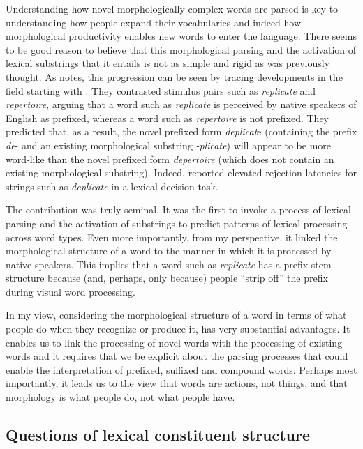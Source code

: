 \documentclass[output=paper]{langsci/langscibook}
\begin{document}
Understanding how novel morphologically complex words are parsed is key to understanding how people expand their vocabularies and indeed how morphological productivity enables new words to enter the language.  There seems to be good reason to believe that this morphological parsing and the activation of lexical substrings that it entails is not as simple and rigid as was previously thought.  As \citet{Libben2015} notes, this progression can be seen by tracing developments in the field starting with \citet{TaftForster1975}. They contrasted stimulus pairs such as \textit{replicate} and \textit{repertoire}, arguing that a word such as \textit{replicate} is perceived by native speakers of English as prefixed, whereas a word such as \textit{repertoire} is not prefixed. They predicted that, as a result, the novel prefixed form \textit{deplicat}e (containing the prefix \textit{de}{}- and an existing morphological substring \textit{-plicate}) will appear to be more word-like than the novel prefixed form \textit{depertoire} (which does not contain an existing morphological substring). Indeed, \citet{TaftForster1975} reported elevated rejection latencies for strings such as \textit{deplicate} in a lexical decision task.

The \citet{TaftForster1975} contribution was truly seminal. It was the first to invoke a process of lexical parsing and the activation of substrings to predict patterns of lexical processing across word types.  Even more importantly, from my perspective, it linked the morphological structure of a word to the manner in which it is processed by native speakers. This implies that a word such as \textit{replicate} has a prefix-stem structure because (and, perhaps, only because) people ``strip off'' the prefix during visual word processing.  

In my view, considering the morphological structure of a word in terms of what people do when they recognize or produce it, has very substantial advantages. It enables us to link the processing of novel words with the processing of existing words and it requires that we be explicit about the parsing processes that could enable the interpretation of prefixed, suffixed and compound words. Perhaps most importantly, it leads us to the view that words are actions, not things, and that morphology is what people do, not what people have. 

\subsection{Questions of lexical constituent structure}\label{sec:libben:1.2}
\end{document}
